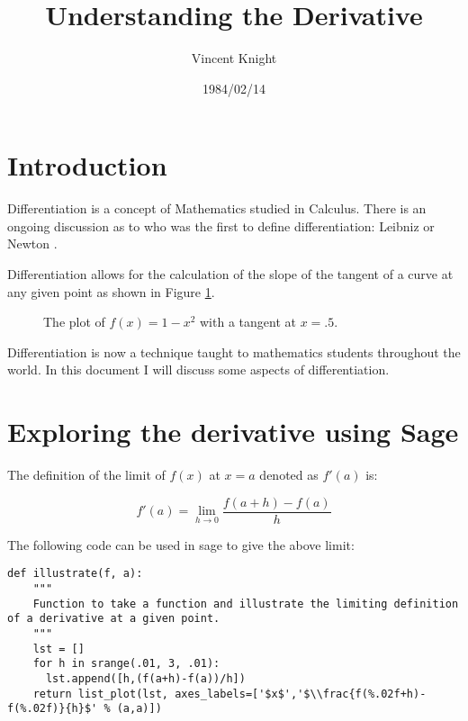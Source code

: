 \documentclass[a4paper]{article}
\title{Understanding the Derivative}
\author{Vincent Knight}
\date{1984/02/14}
\begin{document}
\maketitle

\section{Introduction}

Differentiation is a concept of Mathematics studied in Calculus. There is an ongoing discussion as to who was the first to define differentiation: Leibniz or Newton \cite{bardi2006calculus}.

Differentiation allows for the calculation of the slope of the tangent of a curve at any given point as shown in Figure \ref{exampleplot}.

\begin{figure}[!htbp]
\begin{center}
\end{center}
\caption{The plot of $f(x)=1-x^2$ with a tangent at $x=.5$.}\label{exampleplot}
\end{figure}

Differentiation is now a technique taught to mathematics students throughout the world. In this document I will discuss some aspects of differentiation.

\section{Exploring the derivative using Sage}

The definition of the limit of $f(x)$ at $x=a$ denoted as $f'(a)$ is:

\begin{equation}
f'(a) = \lim_{h\to0}\frac{f(a+h)-f(a)}{h}
\end{equation}

The following code can be used in sage to give the above limit:

\begin{verbatim}
def illustrate(f, a):
    """
    Function to take a function and illustrate the limiting definition of a derivative at a given point.
    """
    lst = []
    for h in srange(.01, 3, .01):
      lst.append([h,(f(a+h)-f(a))/h])
    return list_plot(lst, axes_labels=['$x$','$\\frac{f(%.02f+h)-f(%.02f)}{h}$' % (a,a)])
\end{verbatim}
\end{document}
